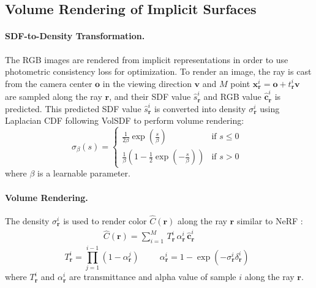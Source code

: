 \documentclass[a4paper]{paper}
\begin{document}
\subsection{Volume Rendering of Implicit Surfaces}\label{rendering}
\paragraph{SDF-to-Density Transformation.} The RGB images are rendered from implicit representations in order to use photometric consistency loss for optimization. To render an image, the ray is cast from the camera center $\mathbf{o}$ in the viewing direction $\mathbf{v}$ and $M$ point $\mathbf{x}_\mathbf{r}^i = \mathbf{o} + t_\mathbf{r}^i\mathbf{v}$ are sampled along the ray $\mathbf{r}$, and their SDF value $\hat{s}_\mathbf{r}^i$ and RGB value $\hat{\mathbf{c}}^i_\mathbf{r}$ is predicted. This predicted SDF value $\hat{s}_\mathbf{r}^i$ is converted into density $\sigma_\mathbf{r}^i$ using Laplacian CDF following VolSDF \cite{yariv2021volume} to perform volume rendering:
\begin{equation}\label{laplace}
\sigma_\beta(s) = \begin{cases} \frac{1}{2\beta} \exp\left( \frac{s}{\beta} \right) & \text{if } s\leq 0 \\
\frac{1}{\beta}\left( 1-\frac{1}{2}\exp\left ( -\frac{s}{\beta} \right ) \right) & \text{if } s>0
\end{cases} \enspace 
\end{equation}
where $\beta$ is a learnable parameter.

\paragraph{Volume Rendering.} The density $\sigma_\mathbf{r}^i$ is used to render color $\hat{C}(\mathbf{r})$ along the ray $\mathbf{r}$ similar to NeRF \cite{mildenhall2020nerf}:
\begin{align} \label{nerf_color}
\hat{C}(\mathbf{r}) = \sum_{i=1}^M \, T_\mathbf{r}^i \, \alpha_\mathbf{r}^i \, \hat{\mathbf{c}}_\mathbf{r}^i \hspace{1cm}
\end{align}
\begin{equation}
T_\mathbf{r}^i = \prod_{j=1}^{i-1}\left(1-\alpha_\mathbf{r}^j\right)\hspace{1cm}
\alpha_\mathbf{r}^i = 1-\exp\left(-\sigma_\mathbf{r}^i\delta_\mathbf{r}^i\right) \enspace
\label{volume_render}
\end{equation}
where $T_\mathbf{r}^i$ and $\alpha_\mathbf{r}^i$ are transmittance and alpha value of sample $i$ along the ray $\mathbf{r}$. \\
\end{document}
